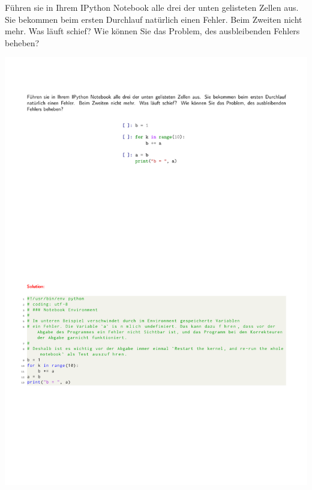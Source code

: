 Führen sie in Ihrem IPython Notebook alle drei der unten gelisteten Zellen aus. Sie bekommen beim ersten Durchlauf natürlich einen Fehler. Beim Zweiten nicht mehr. Was läuft schief? Wie können Sie das Problem, des ausbleibenden Fehlers beheben?
\begin{center}
	\includegraphics[scale=.9, trim={0cm 20cm 5cm 4cm}, clip]{SeitenEffekteZellen/example.pdf}
\end{center}
